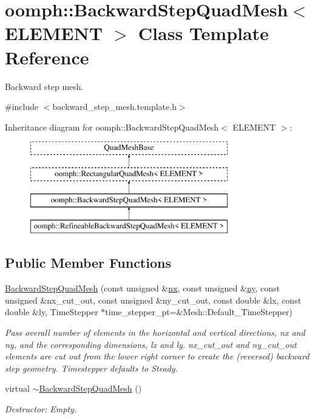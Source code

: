 \hypertarget{classoomph_1_1BackwardStepQuadMesh}{}\section{oomph\+:\+:Backward\+Step\+Quad\+Mesh$<$ E\+L\+E\+M\+E\+NT $>$ Class Template Reference}
\label{classoomph_1_1BackwardStepQuadMesh}


Backward step mesh.  




{\ttfamily \#include $<$backward\+\_\+step\+\_\+mesh.\+template.\+h$>$}

Inheritance diagram for oomph\+:\+:Backward\+Step\+Quad\+Mesh$<$ E\+L\+E\+M\+E\+NT $>$\+:\begin{figure}[H]
\begin{center}
\leavevmode
\includegraphics[height=4.000000cm]{classoomph_1_1BackwardStepQuadMesh}
\end{center}
\end{figure}
\subsection*{Public Member Functions}
\begin{DoxyCompactItemize}
\item 
\hyperlink{classoomph_1_1BackwardStepQuadMesh_ae8374ae7d3646c00fec4fc9c2d604cf8}{Backward\+Step\+Quad\+Mesh} (const unsigned \&\hyperlink{classoomph_1_1RectangularQuadMesh_abfef93d6322886cdce14a437186e4821}{nx}, const unsigned \&\hyperlink{classoomph_1_1RectangularQuadMesh_a86d76a55eb7c4e8bca9b74d23c8b0412}{ny}, const unsigned \&nx\+\_\+cut\+\_\+out, const unsigned \&ny\+\_\+cut\+\_\+out, const double \&lx, const double \&ly, Time\+Stepper $\ast$time\+\_\+stepper\+\_\+pt=\&Mesh\+::\+Default\+\_\+\+Time\+Stepper)
\begin{DoxyCompactList}\small\item\em Pass overall number of elements in the horizontal and vertical directions, nx and ny, and the corresponding dimensions, lx and ly. nx\+\_\+cut\+\_\+out and ny\+\_\+cut\+\_\+out elements are cut out from the lower right corner to create the (reversed) backward step geometry. Timestepper defaults to Steady. \end{DoxyCompactList}\item 
virtual \hyperlink{classoomph_1_1BackwardStepQuadMesh_aec4e05ad80d83327050653ebabce9564}{$\sim$\+Backward\+Step\+Quad\+Mesh} ()
\begin{DoxyCompactList}\small\item\em Destructor\+: Empty. \end{DoxyCompactList}\end{DoxyCompactItemize}
